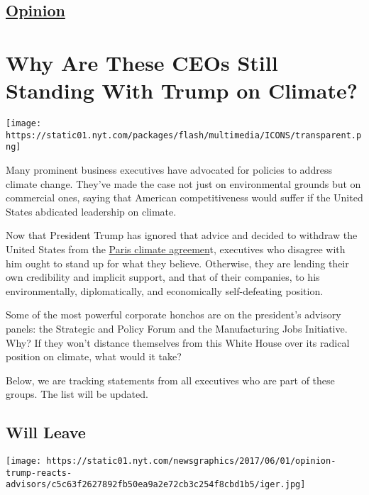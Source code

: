 \hypertarget{-opinion-}{%
\subsection{\texorpdfstring{ \href{/section/opinion}{Opinion}
}{ Opinion }}\label{-opinion-}}

\hypertarget{why-are-these-ceos-still-standing-with-trump-on-climate}{%
\section{Why Are These CEOs Still Standing With Trump on
Climate?}\label{why-are-these-ceos-still-standing-with-trump-on-climate}}

\texttt{[image: https://static01.nyt.com/packages/flash/multimedia/ICONS/transparent.png]}

Many prominent business executives have advocated for policies to
address climate change. They've made the case not just on environmental
grounds but on commercial ones, saying that American competitiveness
would suffer if the United States abdicated leadership on climate.

Now that President Trump has ignored that advice and decided to withdraw
the United States from the
\href{https://www.nytimes.com/2017/06/01/climate/trump-paris-climate-agreement.html}{Paris
climate agreemen}t, executives who disagree with him ought to stand up
for what they believe. Otherwise, they are lending their own credibility
and implicit support, and that of their companies, to his
environmentally, diplomatically, and economically self-defeating
position.

Some of the most powerful corporate honchos are on the president's
advisory panels: the Strategic and Policy Forum and the Manufacturing
Jobs Initiative. Why? If they won't distance themselves from this White
House over its radical position on climate, what would it take?

Below, we are tracking statements from all executives who are part of
these groups. The list will be updated.

\hypertarget{will-leave}{%
\subsection{Will Leave}\label{will-leave}}

\texttt{[image: https://static01.nyt.com/newsgraphics/2017/06/01/opinion-trump-reacts-advisors/c5c63f2627892fb50ea9a2e72cb3c254f8cbd1b5/iger.jpg]}

